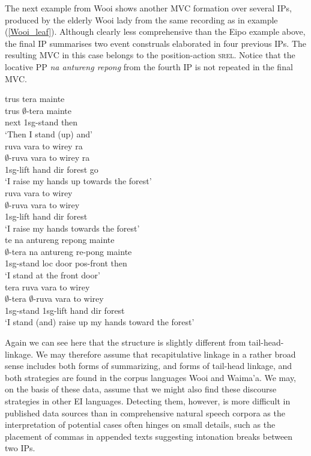 The next example from Wooi shows another MVC formation over several IPs, produced by the elderly Wooi lady from the same recording as in example (\ref{Wooi_leaf}). Although clearly less comprehensive than the Eipo example above, the final IP summarises two event construals elaborated in four previous IPs. The resulting MVC in this case belongs to the position-action \textsc{srel}. Notice that the locative PP \textit{na antureng repong} from the fourth IP is not repeated in the final MVC.

\pex \label{}
\a
\gll trus tera mainte \\
trus $\emptyset$-tera mainte \\
\glc next \acs{1}\acs{sg}-stand then \\
\glft `Then I stand (up) and'\\ 
\z
\a
\gll ruva vara to wirey ra \\
$\emptyset$-ruva vara to wirey ra \\
\glc \acs{1}\acs{sg}-lift hand \acs{dir} forest go \\
\glft `I raise my hands up towards the forest'\\ 
\z
\a
\gll ruva vara to wirey \\
$\emptyset$-ruva vara to wirey \\
\glc \acs{1}\acs{sg}-lift hand \acs{dir} forest \\
\glft `I raise my hands towards the forest'\\ 
\z
\a
\gll te na antureng repong mainte \\
$\emptyset$-tera na antureng re-pong mainte \\
\glc \acs{1}\acs{sg}-stand \acs{loc} door \acs{pos}-front then \\
\glft `I stand at the front door'\\ 
\z
\a
\gll tera ruva vara to wirey \\
$\emptyset$-tera $\emptyset$-ruva vara to wirey \\
\glc \acs{1}\acs{sg}-stand \acs{1}\acs{sg}-lift hand \acs{dir} forest \\
\glft `I stand (and) raise up my hands toward the forest' \\ 
\z
\xe

Again we can see here that the structure is slightly different from tail-head-linkage. We may therefore assume that recapitulative linkage in a rather broad sense includes both forms of summarizing, and forms of tail-head linkage, and both strategies are found in the corpus languages Wooi and Waima'a. We may, on the basis of these data, assume that we might also find these discourse strategies in other EI languages. Detecting them, however, is more difficult in published data sources than in comprehensive natural speech corpora as the interpretation of potential cases often hinges on small details, such as the placement of commas in appended texts suggesting intonation breaks between two IPs.

